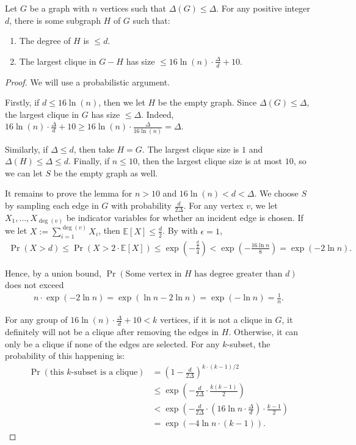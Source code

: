 \documentclass[11pt]{article}
\begin{document}
\begin{lemma}\label{clique-removal}
Let $G$ be a graph with $n$ vertices such that $\Delta{(G)}\le \Delta$. For any positive integer $d$, there is some subgraph $H$ of $G$ such that:
\begin{enumerate}
    \item\label{S-degree} The degree of $H$ is $\le d$.
    \item\label{clique-size} The largest clique in $G-H$ has size $\le 16\ln(n)\cdot \frac {\Delta}d + 10$.
\end{enumerate}
\end{lemma}
\begin{proof}
    We will use a probabilistic argument.
    
    Firstly, if $d\le 16\ln (n)$, then we let $H$ be the empty graph. Since $\Delta{(G)}\le \Delta$, the largest clique in $G$ has size $\le \Delta$. Indeed, $16\ln (n)\cdot \frac {\Delta}d+10\ge 16\ln(n)\cdot \frac \Delta{16\ln(n)}=\Delta$. 

    Similarly, if $\Delta\le d$, then take $H=G$. The largest clique size is $1$ and $\Delta{(H)}\le \Delta\le d$. Finally, if $n\le 10$, then the largest clique size is at most $10$, so we can let $S$ be the empty graph as well. 
    
    It remains to prove the lemma for $n>10$ and $16\ln(n)<d<\Delta$. We choose $S$ by sampling each edge in $G$ with probability $\frac {d}{2\Delta}$. For any vertex $v$, we let $X_1,\dots,X_{\deg{(v)}}$ be indicator variables for whether an incident edge is chosen. If we let $X:=\sum_{i=1}^{\deg{(v)}} X_i$, then $\mathbb{E}[X]\le \frac {d}2$. By  with $\epsilon=1$, 
    \begin{align*}
        \Pr(X>d)\le \Pr\left(X>2\cdot\mathbb{E}[X]\right)\le\exp\left(-\frac{\frac{d}{2}}{4}\right)<\exp\left(-\frac {16\ln n}{8}\right) =\exp(-2\ln n).
    \end{align*}

    Hence, by a union bound, $\Pr(\text{Some vertex in $H$ has degree greater than $d$})$ does not exceed
    \begin{align*}
        n\cdot \exp\left(-2\ln n\right)=\exp(\ln n-2\ln n)=\exp (-\ln n)=\frac 1n.
    \end{align*}
    
    For any group of $16\ln(n)\cdot \frac {\Delta}d+10<k$ vertices, if it is not a clique in $G$, it definitely will not be a clique after removing the edges in $H$. Otherwise, it can only be a clique if none of the edges are selected. For any $k$-subset, the probability of this happening is:
    \begin{align*}
        \Pr(\text{this $k$-subset is a clique})&={\left(1-\frac {d}{2\Delta}\right)}^{k\cdot(k-1)/2}\\
        &\le\exp\left(-\frac d{2\Delta}\cdot \frac{k(k-1)}2\right)\\
        &<\exp\left(-\frac{d}{2\Delta}\cdot \left(16\ln n\cdot \frac {\Delta}d\right)\cdot \frac{k-1}2\right)\\
        &=\exp\left(-4\ln n\cdot (k-1)\right).
    \end{align*}


\end{proof}
\end{document}
